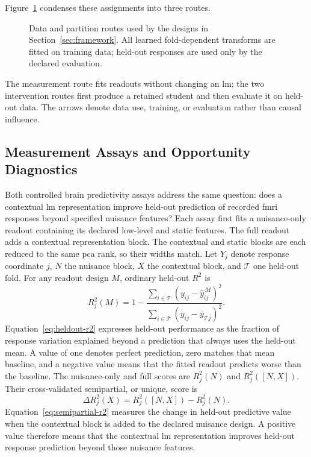 Figure~\ref{fig:data-partition-routes} condenses these assignments into three routes.

\begin{figure}[H]
  \centering
  \resizebox{\textwidth}{!}{}
  \caption{Data and partition routes used by the designs in Section~\ref{sec:framework}. All learned fold-dependent transforms are fitted on training data; held-out responses are used only by the declared evaluation.}
  \label{fig:data-partition-routes}
\end{figure}
\FloatBarrier

The measurement route fits readouts without changing an \ac{lm}; the two intervention routes first produce a retained student and then evaluate it on held-out data.
The arrows denote data use, training, or evaluation rather than causal influence.

\subsection{Measurement Assays and Opportunity Diagnostics}
\label{sec:measurement-prerequisites}

Both controlled brain predictivity assays address the same question: does a contextual \ac{lm} representation improve held-out prediction of recorded \ac{fmri} responses beyond specified nuisance features?
Each assay first fits a nuisance-only readout containing its declared low-level and static features.
The full readout adds a contextual representation block.
The contextual and static blocks are each reduced to the same \ac{pca} rank, so their widths match.
Let \(Y_j\) denote response coordinate \(j\), \(N\) the nuisance block, \(X\) the contextual block, and \(\mathcal T\) one held-out fold.
For any readout design \(M\), ordinary held-out \(R^2\) is
\begin{equation}
R_j^2(M)
=
1-
\frac{\sum_{i\in\mathcal T}(y_{ij}-\widehat y_{ij}^{\,M})^2}
{\sum_{i\in\mathcal T}(y_{ij}-\bar y_{\mathcal Tj})^2}.
\label{eq:heldout-r2}
\end{equation}
Equation~\ref{eq:heldout-r2} expresses held-out performance as the fraction of response variation explained beyond a prediction that always uses the held-out mean.
A value of one denotes perfect prediction, zero matches that mean baseline, and a negative value means that the fitted readout predicts worse than the baseline.
The nuisance-only and full scores are \(R_j^2(N)\) and \(R_j^2([N,X])\).
Their cross-validated semipartial, or unique, score is
\begin{equation}
\Delta R_j^2(X)
=
R_j^2([N,X])-R_j^2(N).
\label{eq:semipartial-r2}
\end{equation}
Equation~\ref{eq:semipartial-r2} measures the change in held-out predictive value when the contextual block is added to the declared nuisance design.
A positive value therefore means that the contextual \ac{lm} representation improves held-out response prediction beyond those nuisance features.

